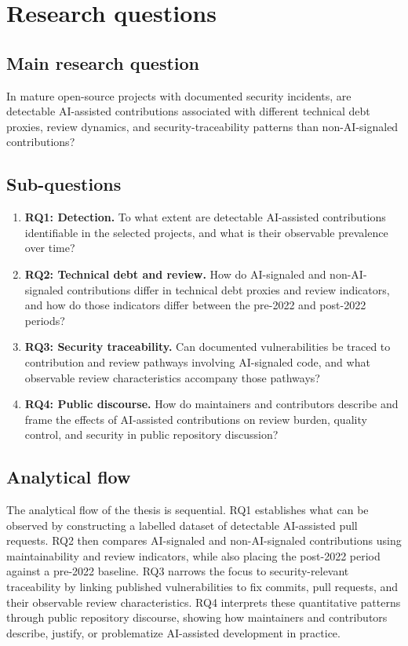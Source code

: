 \chapter{Research questions}
\label{ch:research-questions}

\section{Main research question}
In mature open-source projects with documented security incidents, are detectable AI-assisted contributions associated with different technical debt proxies, review dynamics, and security-traceability patterns than non-AI-signaled contributions?

\section{Sub-questions}
\begin{enumerate}
    \item \textbf{RQ1: Detection.} To what extent are detectable AI-assisted contributions identifiable in the selected projects, and what is their observable prevalence over time?
    \item \textbf{RQ2: Technical debt and review.} How do AI-signaled and non-AI-signaled contributions differ in technical debt proxies and review indicators, and how do those indicators differ between the pre-2022 and post-2022 periods?
    \item \textbf{RQ3: Security traceability.} Can documented vulnerabilities be traced to contribution and review pathways involving AI-signaled code, and what observable review characteristics accompany those pathways?
    \item \textbf{RQ4: Public discourse.} How do maintainers and contributors describe and frame the effects of AI-assisted contributions on review burden, quality control, and security in public repository discussion?
\end{enumerate}

\section{Analytical flow}
The analytical flow of the thesis is sequential. RQ1 establishes what can be observed by constructing a labelled dataset of detectable AI-assisted pull requests. RQ2 then compares AI-signaled and non-AI-signaled contributions using maintainability and review indicators, while also placing the post-2022 period against a pre-2022 baseline. RQ3 narrows the focus to security-relevant traceability by linking published vulnerabilities to fix commits, pull requests, and their observable review characteristics. RQ4 interprets these quantitative patterns through public repository discourse, showing how maintainers and contributors describe, justify, or problematize AI-assisted development in practice.
